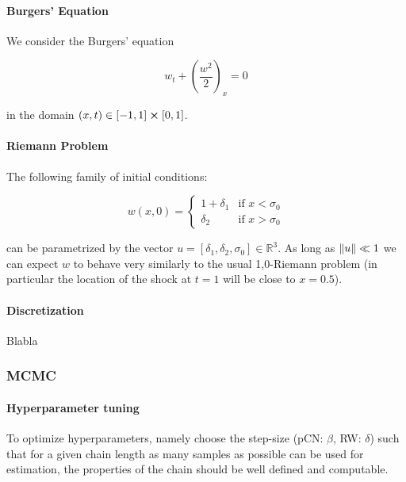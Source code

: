 \documentclass[11pt]{article}
\newcommand{\R}{{\mathbb{R}}}
\begin{document}
\paragraph{Burgers' Equation}
\label{sec:orga273dd1}

We consider the Burgers' equation

\begin{equation}
\label{eqn:burgers}
  w_t + \left( \frac{w^2}{2} \right)_x = 0
\end{equation}

in the domain \((x, t) \in [-1, 1] \cross [0,1]\).

\paragraph{Riemann Problem}
\label{sec:org8f41028}

The following family of initial conditions:

\begin{equation}
\label{eqn:perturbed_riemann}
  w(x, 0) =
  \begin{cases}
    1 + \delta_1 & \text{if } x < \sigma_0 \\
    \delta_2     & \text{if } x > \sigma_0    
  \end{cases}
\end{equation}

can be parametrized by the vector \(u = [\delta_1, \delta_2, \sigma_0] \in \R^3\).
As long as \(\norm{u} \ll 1\) we can expect \(w\) to behave very similarly to the
usual 1,0-Riemann problem (in particular the location of the shock at \(t=1\) will be
close to \(x=0.5\)).

\paragraph{Discretization}
\label{sec:org8d47fba}

Blabla
\subsubsection{MCMC}
\label{sec:orgb19173d}

\paragraph{Hyperparameter tuning}
\label{sec:org544f706}

To optimize hyperparameters, namely choose the step-size (pCN: \(\beta\), RW: \(\delta\)) such that for a given chain length
as many samples as possible can be used for estimation, the properties of the chain
should be well defined and computable.
\end{document}
